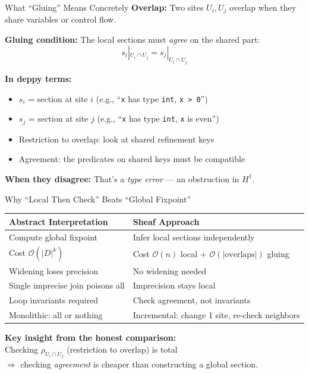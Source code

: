 \documentclass[aspectratio=169,10pt]{beamer}
\begin{document}
\begin{frame}{What ``Gluing'' Means Concretely}
\textbf{Overlap:} Two sites $U_i, U_j$ overlap when they share variables or control flow.

\textbf{Gluing condition:} The local sections must \emph{agree} on the shared part:
\[
s_i|_{U_i \cap U_j} = s_j|_{U_i \cap U_j}
\]

\vspace{0.3em}
\textbf{In deppy terms:}
\begin{itemize}
  \item $s_i$ = section at site $i$ (e.g., ``\texttt{x} has type \texttt{int}, \texttt{x > 0}'')
  \item $s_j$ = section at site $j$ (e.g., ``\texttt{x} has type \texttt{int}, \texttt{x} is even'')
  \item Restriction to overlap: look at shared refinement keys
  \item Agreement: the predicates on shared keys must be compatible
\end{itemize}

\vspace{0.3em}
\textbf{When they disagree:} That's a \emph{type error} --- an obstruction in $H^1$.
\end{frame}

\begin{frame}{Why ``Local Then Check'' Beats ``Global Fixpoint''}
\begin{center}
\renewcommand{\arraystretch}{1.4}
\begin{tabular}{@{}p{5cm}p{5cm}@{}}
\toprule
\textbf{Abstract Interpretation} & \textbf{Sheaf Approach} \\
\midrule
Compute global fixpoint & Infer local sections independently \\
Cost $\mathcal{O}(|D|^k)$ & Cost $\mathcal{O}(n)$ local + $\mathcal{O}(|\text{overlaps}|)$ gluing \\
Widening loses precision & No widening needed \\
Single imprecise join poisons all & Imprecision stays local \\
Loop invariants required & Check agreement, not invariants \\
Monolithic: all or nothing & Incremental: change 1 site, re-check neighbors \\
\bottomrule
\end{tabular}
\end{center}

\vspace{0.3em}
\textbf{Key insight from the honest comparison:}\\
Checking $\rho_{U_i \cap U_j}$ (restriction to overlap) is total\\
$\Rightarrow$ checking \emph{agreement} is cheaper than constructing a global section.
\end{frame}
\end{document}
